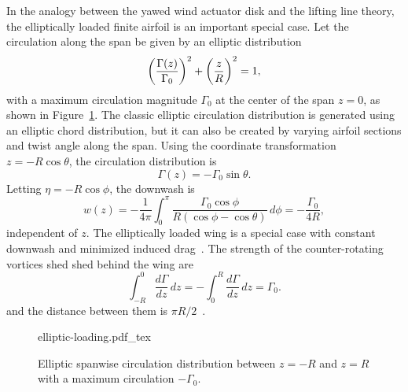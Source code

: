 In the analogy between the yawed wind actuator disk and the lifting line theory, the elliptically loaded finite airfoil is an important special case. Let the circulation along the span be given by an elliptic distribution
\begin{equation}
\label{eq:elliptic-circulation}
\left( \frac{\Gamma(z)}{\Gamma_0} \right)^2 + \left( \vphantom{ \frac{\Gamma(z)}{\Gamma_0}} \frac{z}{R} \right)^2  =  1,
\end{equation}
with a maximum circulation magnitude $\Gamma_0$ at the center of the span $z=0$, as shown in Figure~\ref{fig:elliptic-loading}. The classic elliptic circulation distribution is generated using an elliptic chord distribution, but it can also be created by varying airfoil sections and twist angle along the span. Using the coordinate transformation $z=-R \cos \theta$, the circulation distribution is~\cite[pg. 200]{Milne-Thomson1973a}
\begin{equation}
\Gamma(z) = -\Gamma_0 \sin \theta.
\end{equation}
Letting $\eta = -R\cos \phi$, the downwash is
\begin{equation}
w(z) = -\frac{1}{4\pi} \int_0^\pi \frac{\Gamma_0 \cos \phi}{ R (\cos \phi - \cos \theta)} \, d\phi = -\frac{\Gamma_0}{4R},
\end{equation}
independent of $z$. The elliptically loaded wing is a special case with constant downwash and minimized induced drag~\cite[pp. 201, 209]{Milne-Thomson1973a}. The strength of the counter-rotating vortices shed shed behind the wing are
\begin{equation}
\label{eq:gamma_shed}
\int_{-R}^{0} \frac{d\Gamma}{dz} \, dz = -\int_{0}^{R} \frac{d\Gamma}{dz} \, dz = \Gamma_0.
\end{equation}
and the distance between them is $\pi R/2$~\cite[pg. 209]{Milne-Thomson1973a}.

\begin{figure}
\begin{center}
{elliptic-loading.pdf_tex}
\caption{\label{fig:elliptic-loading} Elliptic spanwise circulation distribution between $z=-R$ and $z=R$ with a maximum circulation $-\Gamma_0$.}
\end{center}
\end{figure}

